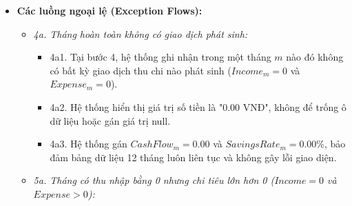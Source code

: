 \documentclass[11pt,a4paper]{article}
\providecommand{\tightlist}{
  \setlength{\itemsep}{0pt}\setlength{\parskip}{0pt}}
\begin{document}
\begin{itemize}
\begin{itemize}
    \begin{itemize}
    \tightlist
    \item
      2c1. Người dùng chọn tab "Sao kê công nợ đối tác" và chọn một cá
      nhân cụ thể từ danh sách đối tác có phát sinh giao dịch nợ.
    \item
      2c2. Hệ thống trích xuất toàn bộ các bản ghi trong bảng
      \texttt{debt} liên quan đến cá nhân này, sắp xếp theo thứ tự ngày
      tăng dần theo quy tắc \texttt{FR-REP-04}.
    \item
      2c3. Với từng giao dịch, hệ thống tính số dư nợ lũy kế: tăng phải
      thu nếu \texttt{lend}, giảm phải thu nếu
      \texttt{collect}/\texttt{write-off\ lend}; tăng phải trả nếu
      \texttt{borrow}, giảm phải trả nếu
      \texttt{repay}/\texttt{write-off\ borrow}.
    \item
      2c4. Hệ thống tổng kết: Tổng đã cho vay, Tổng đã thu hồi, Dư nợ
      phải thu còn lại, Tổng đã vay, Tổng đã trả, Dư nợ phải trả còn
      lại.
    \item
      2c5. Hệ thống hiển thị bảng sao kê chi tiết phục vụ đối soát minh
      bạch.
    \end{itemize}
  \end{itemize}
\item
  \textbf{Các luồng ngoại lệ (Exception Flows):}

  \begin{itemize}
  \tightlist
  \item
    \emph{4a. Tháng hoàn toàn không có giao dịch phát sinh:}

    \begin{itemize}
    \tightlist
    \item
      4a1. Tại bước 4, hệ thống ghi nhận trong một tháng \(m\) nào đó
      không có bất kỳ giao dịch thu chi nào phát sinh (\(Income_m = 0\)
      và \(Expense_m = 0\)).
    \item
      4a2. Hệ thống hiển thị giá trị số tiền là "0.00 VNĐ", không để
      trống ô dữ liệu hoặc gán giá trị null.
    \item
      4a3. Hệ thống gán \(CashFlow_m = 0.00\) và
      \(SavingsRate_m = 0.00\%\), bảo đảm bảng dữ liệu 12 tháng luôn
      liên tục và không gây lỗi giao diện.
    \end{itemize}
  \item
    \emph{5a. Tháng có thu nhập bằng 0 nhưng chi tiêu lớn hơn 0
    (\(Income = 0\) và \(Expense > 0\)):}


\end{itemize}
\end{itemize}
\end{document}
